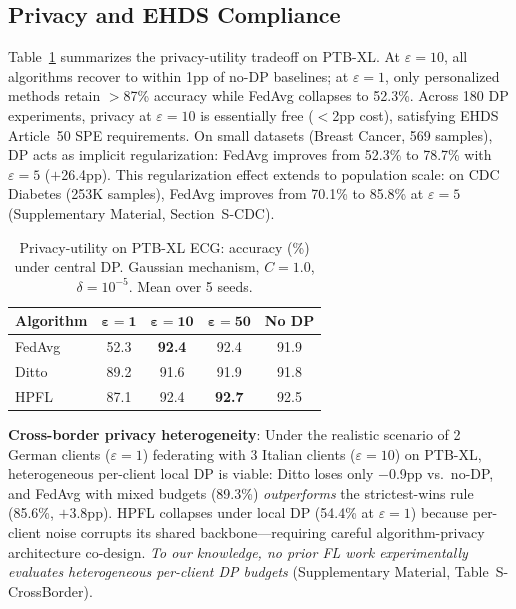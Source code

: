 \documentclass[conference]{IEEEtran}
\begin{document}
\subsection{Privacy and EHDS Compliance}

Table~\ref{tab:dp_mini} summarizes the privacy-utility tradeoff on PTB-XL. At $\varepsilon{=}10$, all algorithms recover to within 1pp of no-DP baselines; at $\varepsilon{=}1$, only personalized methods retain $>$87\% accuracy while FedAvg collapses to 52.3\%. Across 180 DP experiments, privacy at $\varepsilon{=}10$ is essentially free ($<$2pp cost), satisfying EHDS Article~50 SPE requirements. On small datasets (Breast Cancer, 569 samples), DP acts as implicit regularization: FedAvg improves from 52.3\% to 78.7\% with $\varepsilon{=}5$ ($+$26.4pp). This regularization effect extends to population scale: on CDC Diabetes (253K samples), FedAvg improves from 70.1\% to 85.8\% at $\varepsilon{=}5$ (Supplementary Material, Section~S-CDC).

\begin{table}[htbp]
\centering
\caption{Privacy-utility on PTB-XL ECG: accuracy (\%) under central DP. Gaussian mechanism, $C{=}1.0$, $\delta{=}10^{-5}$. Mean over 5 seeds.}
\label{tab:dp_mini}
\small
\begin{tabular}{lcccc}
\toprule
\textbf{Algorithm} & $\boldsymbol{\varepsilon{=}1}$ & $\boldsymbol{\varepsilon{=}10}$ & $\boldsymbol{\varepsilon{=}50}$ & \textbf{No DP} \\
\midrule
FedAvg & 52.3 & \textbf{92.4} & 92.4 & 91.9 \\
Ditto & 89.2 & 91.6 & 91.9 & 91.8 \\
HPFL & 87.1 & 92.4 & \textbf{92.7} & 92.5 \\
\bottomrule
\end{tabular}
\end{table}

\textbf{Cross-border privacy heterogeneity}: Under the realistic scenario of 2 German clients ($\varepsilon{=}1$) federating with 3 Italian clients ($\varepsilon{=}10$) on PTB-XL, heterogeneous per-client local DP is viable: Ditto loses only $-$0.9pp vs.\ no-DP, and FedAvg with mixed budgets (89.3\%) \textit{outperforms} the strictest-wins rule (85.6\%, $+$3.8pp). HPFL collapses under local DP (54.4\% at $\varepsilon{=}1$) because per-client noise corrupts its shared backbone---requiring careful algorithm-privacy architecture co-design. \textit{To our knowledge, no prior FL work experimentally evaluates heterogeneous per-client DP budgets} (Supplementary Material, Table~S-CrossBorder).
\end{document}
